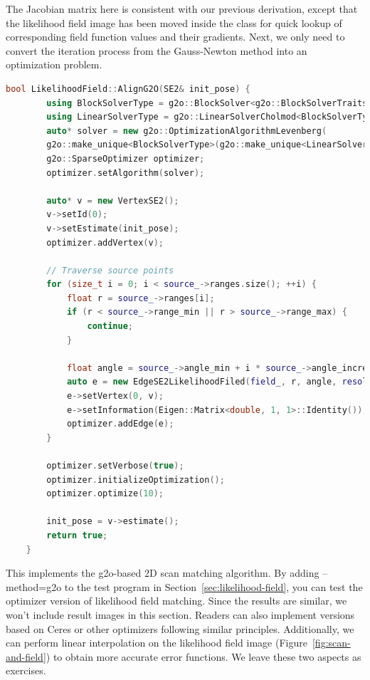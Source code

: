 The Jacobian matrix here is consistent with our previous derivation, except that the likelihood field image has been moved inside the class for quick lookup of corresponding field function values and their gradients. Next, we only need to convert the iteration process from the Gauss-Newton method into an optimization problem.

\begin{lstlisting}[language=c++,caption=src/ch6/likelihood\_field.cc]
	bool LikelihoodField::AlignG2O(SE2& init_pose) {
		using BlockSolverType = g2o::BlockSolver<g2o::BlockSolverTraits<3, 1>>;
		using LinearSolverType = g2o::LinearSolverCholmod<BlockSolverType::PoseMatrixType>;
		auto* solver = new g2o::OptimizationAlgorithmLevenberg(
		g2o::make_unique<BlockSolverType>(g2o::make_unique<LinearSolverType>()));
		g2o::SparseOptimizer optimizer;
		optimizer.setAlgorithm(solver);
		
		auto* v = new VertexSE2();
		v->setId(0);
		v->setEstimate(init_pose);
		optimizer.addVertex(v);
		
		// Traverse source points
		for (size_t i = 0; i < source_->ranges.size(); ++i) {
			float r = source_->ranges[i];
			if (r < source_->range_min || r > source_->range_max) {
				continue;
			}
			
			float angle = source_->angle_min + i * source_->angle_increment;
			auto e = new EdgeSE2LikelihoodFiled(field_, r, angle, resolution_);
			e->setVertex(0, v);
			e->setInformation(Eigen::Matrix<double, 1, 1>::Identity());
			optimizer.addEdge(e);
		}
		
		optimizer.setVerbose(true);
		optimizer.initializeOptimization();
		optimizer.optimize(10);
		
		init_pose = v->estimate();
		return true;
	}
\end{lstlisting}

This implements the g2o-based 2D scan matching algorithm. By adding --method=g2o to the test program in Section~\ref{sec:likelihood-field}, you can test the optimizer version of likelihood field matching. Since the results are similar, we won't include result images in this section. Readers can also implement versions based on Ceres or other optimizers following similar principles. Additionally, we can perform linear interpolation on the likelihood field image (Figure~\ref{fig:scan-and-field}) to obtain more accurate error functions. We leave these two aspects as exercises.


